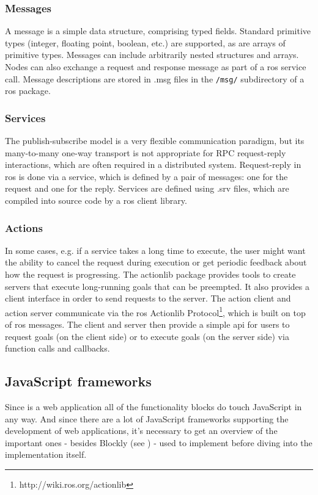 \subsubsection{Messages}
A message is a simple data structure, comprising typed fields. Standard primitive types (integer, floating point, boolean, etc.) are supported, as are arrays of primitive types. Messages can include arbitrarily nested structures and arrays. Nodes can also exchange a request and response message as part of a \gls{ros} service call. Message descriptions are stored in .msg files in the \lstinline!/msg/! subdirectory of a \gls{ros} package.

\subsubsection{Services}
The publish-subscribe model is a very flexible communication paradigm, but its many-to-many one-way transport is not appropriate for RPC request-reply interactions, which are often required in a distributed system. Request-reply in \gls{ros} is done via a service, which is defined by a pair of messages: one for the request and one for the reply. Services are defined using .srv files, which are compiled into source code by a \gls{ros} client library.

\subsubsection{Actions}
In some cases, e.g. if a service takes a long time to execute, the user might want the ability to cancel the request during execution or get periodic feedback about how the request is progressing. The actionlib package provides tools to create servers that execute long-running goals that can be preempted. It also provides a client interface in order to send requests to the server.
The action client and action server communicate via the \gls{ros} Actionlib Protocol\footnote{http://wiki.ros.org/actionlib}, which is built on top of \gls{ros} messages. The client and server then provide a simple \gls{api} for users to request goals (on the client side) or to execute goals (on the server side) via function calls and callbacks.

\subsection{JavaScript frameworks} \label{sub:jsFrameworks}
Since \toolname{} is a web application all of the functionality blocks do touch JavaScript in any way. And since there are a lot of JavaScript frameworks supporting the development of web applications, it's necessary to get an overview of the important ones - besides Blockly (see ) - used to implement \toolname{} before diving into the implementation itself.

